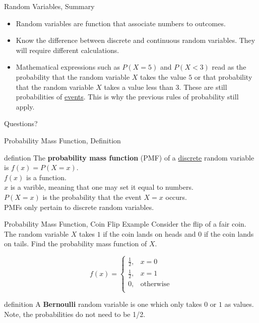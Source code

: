 \documentclass[handout]{beamer}
\newcommand{\qtns}[0]{\begin{center} Questions? \end{center}}
\newcommand{\nl}[1]{\vspace{#1 em}}
\begin{document}
\begin{frame}{Random Variables, Summary}
    \begin{itemize}
        \item Random variables are function that associate numbers to outcomes.
        \item Know the difference between discrete and continuous random variables. They will require different calculations.
        \item Mathematical expressions such as $P(X=5)$ and $P(X<3)$ read as the probability that the random variable $X$ takes the value $5$ or that probability that the random variable $X$ takes a value less than $3$. These are still probabilities of \underline{events}. This is why the previous rules of probability still apply.
    \end{itemize}
    \qtns
\end{frame}

\begin{frame}{Probability Mass Function, Definition}
    \begin{block}{defintion}
        The \textbf{probability mass function} (PMF) of a \underline{discrete} random variable is $f(x) = P(X = x)$.\\ \nl{0.5}
        $f(x)$ is a function.\\ \nl{0.5}
        $x$ is a varible, meaning that one may set it equal to numbers. \\ \nl{0.5}
        $P(X=x)$ is the probability that the event $X=x$ occurs.\\ \nl{0.5}
        PMFs only pertain to discrete random variables.
    \end{block}
\end{frame}

\begin{frame}{Probability Mass Function, Coin Flip Example}
    Consider the flip of a fair coin. The random variable $X$ takes $1$ if the coin lands on heads and $0$ if the coin lands on tails. Find the probability mass function of $X$.

    \pause
    $$
    f(x)= \left\{\begin{array}{lr}
        \frac{1}{2}, &  x = 0\\
        \frac{1}{2}, & x = 1\\
        0, & \text{otherwise}\\
        \end{array}\right.$$

        \pause
\begin{block}{definition}
    A \textbf{Bernoulli} random variable is one which only takes $0$ or $1$ as values. Note, the probabilities do not need to be 1/2.
\end{block}

    \end{frame}
\end{document}
